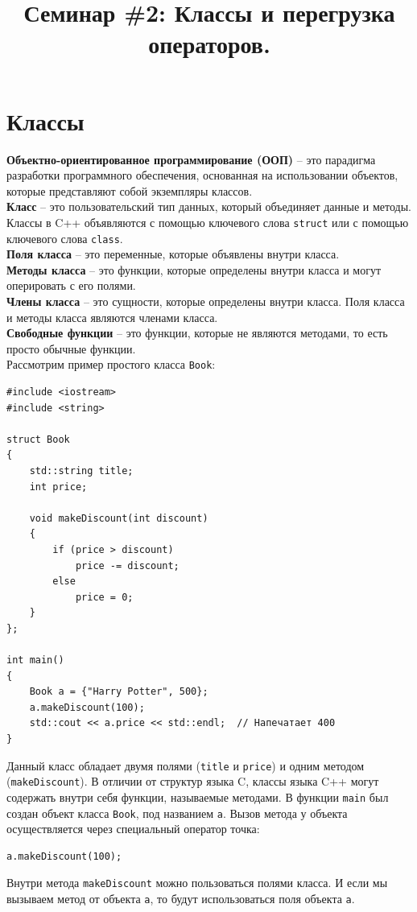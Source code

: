 \documentclass{article}
\begin{document}
\title{Семинар \#2: Классы и перегрузка операторов. \vspace{-5ex}}\date{}\maketitle
\section*{Классы}

\noindent \textbf{Объектно-ориентированное программирование (ООП)} -- это парадигма разработки программного обеспечения, основанная на использовании объектов, которые представляют собой экземпляры классов.\\

\noindent \textbf{Класс} -- это пользовательский тип данных, который объединяет данные и методы. Классы в C++ объявляются с помощью ключевого слова \texttt{struct} или с помощью ключевого слова \texttt{class}. \\

\noindent \textbf{Поля класса} -- это переменные, которые объявлены внутри класса.\\

\noindent \textbf{Методы класса} -- это функции, которые определены внутри класса и могут оперировать с его полями.\\

\noindent \textbf{Члены класса} -- это сущности, которые определены внутри класса. Поля класса и методы класса являются членами класса.\\

\noindent \textbf{Свободные функции} -- это функции, которые не являются методами, то есть просто обычные функции.\\

\noindent Рассмотрим пример простого класса \texttt{Book}:
\begin{lstlisting}
#include <iostream>
#include <string>

struct Book 
{
    std::string title;
    int price;

    void makeDiscount(int discount) 
    {
        if (price > discount)
            price -= discount;
        else
            price = 0;
    }
};

int main() 
{
    Book a = {"Harry Potter", 500};
    a.makeDiscount(100);
    std::cout << a.price << std::endl;  // Напечатает 400
}
\end{lstlisting}
Данный класс обладает двумя полями (\texttt{title} и \texttt{price}) и одним методом (\texttt{makeDiscount}). В отличии от структур языка C, классы языка C++ могут содержать внутри себя функции, называемые методами. В функции \texttt{main} был создан объект класса \texttt{Book}, под названием \texttt{a}. Вызов метода у объекта осуществляется через специальный оператор точка:
\begin{lstlisting}
a.makeDiscount(100);
\end{lstlisting}
Внутри метода \texttt{makeDiscount} можно пользоваться полями класса. И если мы вызываем метод от объекта \texttt{a}, то будут использоваться поля объекта \texttt{a}.
\end{document}

